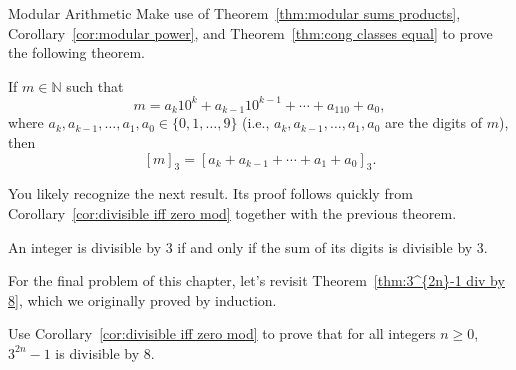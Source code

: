 \begin{section}{Modular Arithmetic}
Make use of Theorem~\ref{thm:modular sums products}, Corollary~\ref{cor:modular power}, and Theorem~\ref{thm:cong classes equal} to prove the following theorem.

\begin{theorem}
If $m\in \mathbb{N}$ such that
\[
m=a_k10^k + a_{k-1}10^{k-1} + \cdots + a_110 + a_0,
\]
where $a_k, a_{k-1}, \ldots, a_1, a_0\in \{0,1,\ldots, 9\}$ (i.e., $a_k, a_{k-1}, \ldots, a_1, a_0$ are the digits of $m$), then
\[
[m]_3 =  [a_k + a_{k-1} + \cdots + a_1 + a_0]_3.
\]
\end{theorem}

You likely recognize the next result. Its proof follows quickly from Corollary~\ref{cor:divisible iff zero mod} together with the previous theorem.

\begin{theorem}
An integer is divisible by $3$ if and only if the sum of its digits is divisible by $3$.
\end{theorem}

For the final problem of this chapter, let's revisit Theorem~\ref{thm:3^{2n}-1 div by 8}, which we originally proved by induction.

\begin{problem}
Use Corollary~\ref{cor:divisible iff zero mod} to prove that for all integers $n \ge 0$, $3^{2n}-1$ is divisible by $8$.
\end{problem}

\end{section}
